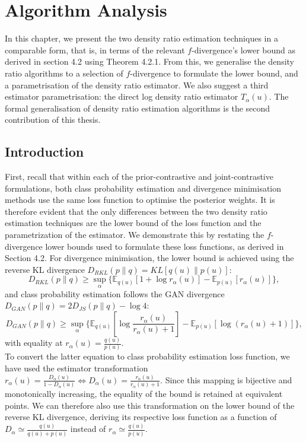 \documentclass[honours,12pt]{unswthesis}
\numberwithin{equation}{section}
\theoremstyle{definition}
\begin{document}
\chapter{Algorithm Analysis}
In this chapter, we present the two density ratio estimation techniques in a comparable form, that is, in terms of the relevant $f$-divergence's lower bound as derived in section 4.2 using Theorem 4.2.1. From this, we generalise the density ratio algorithms to a selection of $f$-divergence to formulate the lower bound, and a parametrisation of the density ratio estimator. We also suggest a third estimator parametrisation: the direct log density ratio estimator $T_\alpha(u)$. The formal generalisation of density ratio estimation algorithms is the second contribution of this thesis.
\section{Introduction}
First, recall that within each of the prior-contrastive and joint-contrastive formulations, both class probability estimation and divergence minimisation methods use the same loss function to optimise the posterior weights. It is therefore evident that the only differences between the two density ratio estimation techniques are the lower bound of the loss function and the parametrization of the estimator. We demonstrate this by restating the $f$-divergence lower bounds used to formulate these loss functions, as derived in Section 4.2. For divergence minimisation, the lower bound is achieved using the reverse KL divergence $D_{RKL}(p\|q)=KL[q(u)\|p(u)]$:
\[D_{RKL}(p\|q)\geq \sup_{\alpha}\{\mathbb{E}_{q(u)}[1+\log r_\alpha(u)]-\mathbb{E}_{p(u)}[r_\alpha(u)]\},\]
and class probability estimation follows the GAN divergence $D_{GAN}(p\|q)=2D_{JS}(p\|q)-\log 4$:
\[D_{GAN}(p\|q)\geq \sup_\alpha\{\mathbb{E}_{q(u)}\left[\log \frac{r_\alpha(u)}{r_\alpha(u)+1}\right]-\mathbb{E}_{p(u)}[\log(r_\alpha(u)+1)]\},\]
with equality at $r_\alpha(u)=\frac{q(u)}{p(u)}$.\\
To convert the latter equation to class probability estimation loss function, we have used the estimator transformation $r_\alpha(u)=\frac{D_\alpha(u)}{1-D_\alpha(u)}\iff D_\alpha(u)=\frac{r_\alpha(u)}{r_\alpha(u)+1}$. Since this mapping is bijective and monotonically increasing, the equality of the bound is retained at equivalent points. We can therefore also use this transformation on the lower bound of the reverse KL divergence, deriving its respective loss function as a function of $D_\alpha\simeq \frac{q(u)}{q(u)+p(u)}$ instead of $r_\alpha\simeq \frac{q(u)}{p(u)}$.
\end{document}
